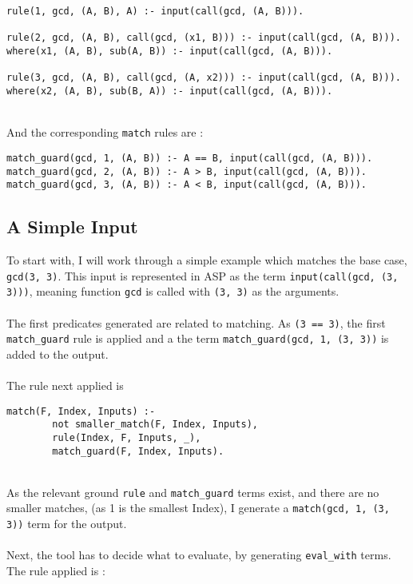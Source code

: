 \begin{lstlisting}
rule(1, gcd, (A, B), A) :- input(call(gcd, (A, B))).

rule(2, gcd, (A, B), call(gcd, (x1, B))) :- input(call(gcd, (A, B))).
where(x1, (A, B), sub(A, B)) :- input(call(gcd, (A, B))).

rule(3, gcd, (A, B), call(gcd, (A, x2))) :- input(call(gcd, (A, B))).
where(x2, (A, B), sub(B, A)) :- input(call(gcd, (A, B))).
\end{lstlisting}
\mbox{} \\
And the corresponding \lstinline{match} rules are :\\ %

\begin{lstlisting}
match_guard(gcd, 1, (A, B)) :- A == B, input(call(gcd, (A, B))).
match_guard(gcd, 2, (A, B)) :- A > B, input(call(gcd, (A, B))).
match_guard(gcd, 3, (A, B)) :- A < B, input(call(gcd, (A, B))).
\end{lstlisting}

\subsection{A Simple Input}
To start with, I will work through a simple example which matches the base case, \lstinline{gcd(3, 3)}. This input is represented in ASP as the term \lstinline{input(call(gcd, (3, 3)))}, meaning function \lstinline{gcd} is called with \lstinline{(3, 3)} as the arguments. \\ \\
The first predicates generated are related to matching. As \lstinline{(3 == 3)}, the first \lstinline{match_guard} rule is applied and a the term \lstinline{match_guard(gcd, 1, (3, 3))} is added to the output.\\ \\ %
The rule next applied is \\

\begin{lstlisting}[firstnumber=197]
match(F, Index, Inputs) :- 
		not smaller_match(F, Index, Inputs), 
		rule(Index, F, Inputs, _), 
		match_guard(F, Index, Inputs).
\end{lstlisting}
\mbox{} \\
As the relevant ground \lstinline{rule} and \lstinline{match_guard} terms exist, and there are no smaller matches, (as 1 is the smallest Index), I generate a \lstinline{match(gcd, 1, (3, 3))} term for the output. \\ \\ %
Next, the tool has to decide what to evaluate, by generating \lstinline{eval_with} terms. The rule applied is :\\ %

